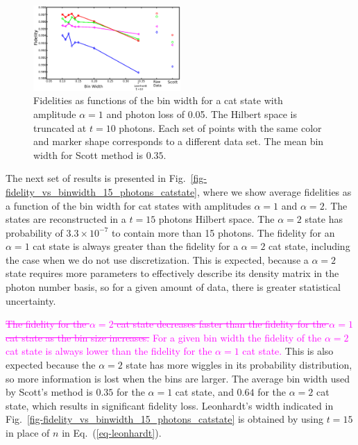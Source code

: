 \documentclass[
reprint,
superscriptaddress,
showpacs,
amsmath,
amssymb,
aps,
pra,
longbibliography
]{revtex4-1}
\providecommand{\aucmnt}[1]{#1}
\providecommand{\editcolor}[2]{\textcolor{#1}{#2}}
\providecommand{\aucmnt}[1]{}
\providecommand{\editcolor}[2]{#2}
\newcommand{\SG}[1]{\editcolor{magenta}{#1}}
\newcommand{\SGs}[1]{\aucmnt{\editcolor{magenta}{\sout{#1}}}}
\begin{document}
\begin{figure}
  \includegraphics[width=0.5\textwidth]{methods_fidelity_singledata.eps}
  \caption{Fidelities as functions of the bin width for
    a cat state with amplitude $\alpha=1$ and photon loss of
    0.05. The Hilbert space is truncated at $t=10$ photons. Each set
    of points with the same color and marker shape corresponds to a
    different data set. The mean bin width for Scott method is
    $0.35$.}
  \label{fig-methods_fidelity_singledata}
\end{figure}



The next set of results is presented in
Fig.~\ref{fig-fidelity_vs_binwidth_15_photons_catstate}, where we show
average fidelities as a function of the bin width for cat states with
amplitudes $\alpha=1$ and $\alpha=2$. The states are reconstructed in
a $t=15$ photons Hilbert space. The $\alpha=2$ state has
  probability of $3.3 \times 10^{-7}$ to contain more than 15 photons. 
  The fidelity for an $\alpha=1$ cat state is always greater than the fidelity 
  for a $\alpha=2$ cat state, including the case when we do not use
discretization. This is expected, because a $\alpha = 2$ state
requires more parameters to effectively describe its density matrix in
the photon number basis, so for a given amount of data, there is
greater statistical uncertainty.

\SGs{The fidelity for the $\alpha = 2$ cat state decreases faster than
  the fidelity for the $\alpha=1$ cat state as the bin size
  increases.}  \SG{For a given bin width the fidelity of the
  $\alpha=2$ cat state is always lower than the fidelity for the
  $\alpha=1$ cat state.} This is also expected because the $\alpha =
2$ state has more wiggles in its probability distribution, so more
information is lost when the bins are larger. The average bin width
used by Scott's method is $0.35$ for the $\alpha=1$ cat state, and
$0.64$ for the $\alpha=2$ cat state, which results in significant
fidelity loss. Leonhardt's width indicated in
Fig.~\ref{fig-fidelity_vs_binwidth_15_photons_catstate} is obtained by
using $t=15$ in place of $n$ in Eq.~(\ref{eq-leonhardt}).
\end{document}
